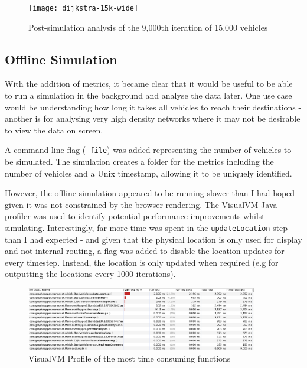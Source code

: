 \documentclass[ %
                    author={Alexander Hill},
                supervisor={Dr. Benjamin Sach},
                    degree={MEng},
                     title={MARMOSET},
                  subtitle={Multi-Agent Route Management using Online Simulation for Efficient Transportation},
                      type={research},
                      year={2016} ]{dissertation}
\begin{document}
\begin{figure}
    \vspace{-2em}
    \centering
    \texttt{[image: dijkstra-15k-wide]}
    \caption{Post-simulation analysis of the 9,000th iteration of 15,000 vehicles}\label{fig:offline-network}
    \vspace{-3em}
\end{figure}

\subsection{Offline Simulation}

With the addition of metrics, it became clear that it would be useful to be able
to run a simulation in the background and analyse the data later. One use case
would be understanding how long it takes all vehicles to reach their
destinations - another is for analysing very high density networks where it may
not be desirable to view the data on screen.

A command line flag (\texttt{--file}) was added representing the number of
vehicles to be simulated. The simulation creates a folder for the metrics
including the number of vehicles and a Unix timestamp, allowing it to be
uniquely identified.

However, the offline simulation appeared to be running slower than I had hoped
given it was not constrained by the browser rendering. The VisualVM Java
profiler was used to identify potential performance improvements whilst
simulating. Interestingly, far more time was spent in the
\texttt{updateLocation} step than I had expected - and given that the physical
location is only used for display and not internal routing, a flag was added to
disable the location updates for every timestep. Instead, the location is only
updated when required (e.g for outputting the locations every 1000 iterations).

\begin{figure}[h]
    \centering
    \includegraphics[width=0.9\textwidth,clip,trim=0 7cm 0 0]{visualvm-profile}
    \caption{VisualVM Profile of the most time consuming functions}\label{fig:visualvm}
\end{figure}
\end{document}
